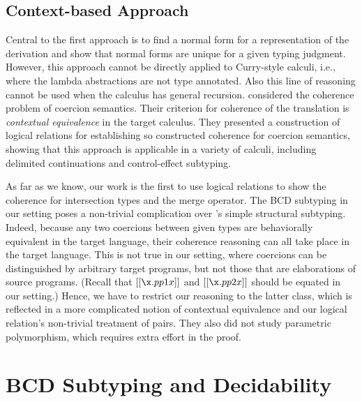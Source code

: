 \subsection{Context-based Approach}

Central to the first approach is to find a normal form for a representation of
the derivation and show that normal forms are unique for a given typing
judgment. However, this approach cannot be directly applied to Curry-style
calculi, i.e., where the lambda abstractions are not type annotated. Also this
line of reasoning cannot be used when the calculus has general recursion.
\citet{biernacki2015logical} considered the coherence problem of coercion
semantics. Their criterion for coherence of the translation is
\textit{contextual equivalence} in the target calculus. They presented a
construction of logical relations for establishing so constructed coherence for
coercion semantics, showing that this approach is applicable in a variety of
calculi, including delimited continuations and control-effect subtyping.

As far as we know, our work is the first to use logical relations to show the
coherence for intersection types and the merge operator. The BCD subtyping in
our setting poses a non-trivial complication over
\citeauthor{biernacki2015logical}'s simple structural subtyping. Indeed, because
any two coercions between given types are behaviorally equivalent in the target
language, their coherence reasoning can all take place in the target language.
This is not true in our setting, where coercions can be distinguished by
arbitrary target programs, but not those that are elaborations of source
programs. (Recall that $ [[\x . pp1 x]]    $ and $ [[ \x . pp2 x]]    $ should be equated in our setting.)
Hence, we have to restrict our reasoning to the latter class, which is reflected
in a more complicated notion of contextual equivalence and our logical
relation's non-trivial treatment of pairs. They also did not study parametric
polymorphism, which requires extra effort in the proof.


\section {BCD Subtyping and Decidability}

